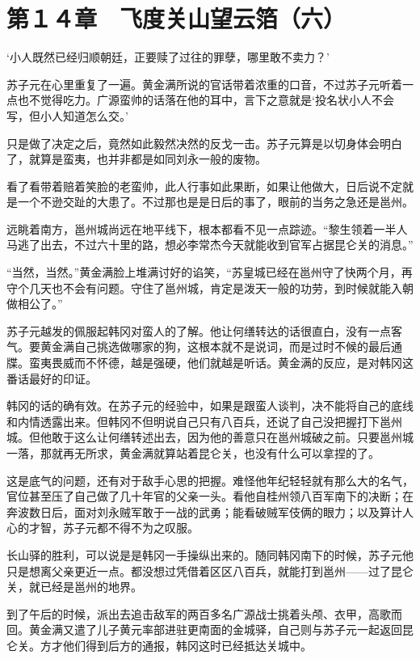 \section{第１４章　飞度关山望云箔（六）}

‘小人既然已经归顺朝廷，正要赎了过往的罪孽，哪里敢不卖力？’

苏子元在心里重复了一遍。黄金满所说的官话带着浓重的口音，不过苏子元听着一点也不觉得吃力。广源蛮帅的话落在他的耳中，言下之意就是‘投名状小人不会写，但小人知道怎么交。’

只是做了决定之后，竟然如此毅然决然的反戈一击。苏子元算是以切身体会明白了，就算是蛮夷，也并非都是如同刘永一般的废物。

看了看带着赔着笑脸的老蛮帅，此人行事如此果断，如果让他做大，日后说不定就是一个不逊交趾的大患了。不过那也是是日后的事了，眼前的当务之急还是邕州。

远眺着南方，邕州城尚远在地平线下，根本都看不见一点踪迹。“黎生领着一半人马逃了出去，不过六十里的路，想必李常杰今天就能收到官军占据昆仑关的消息。”

“当然，当然。”黄金满脸上堆满讨好的谄笑，“苏皇城已经在邕州守了快两个月，再守个几天也不会有问题。守住了邕州城，肯定是泼天一般的功劳，到时候就能入朝做相公了。”

苏子元越发的佩服起韩冈对蛮人的了解。他让何缮转达的话很直白，没有一点客气。要黄金满自己挑选做哪家的狗，这根本就不是说词，而是过时不候的最后通牒。蛮夷畏威而不怀德，越是强硬，他们就越是听话。黄金满的反应，是对韩冈这番话最好的印证。

韩冈的话的确有效。在苏子元的经验中，如果是跟蛮人谈判，决不能将自己的底线和内情透露出来。但韩冈不但明说自己只有八百兵，还说了自己没把握打下邕州城。但他敢于这么让何缮转述出去，因为他的善意只在邕州城破之前。只要邕州城一落，那就再无所求，黄金满就算站着昆仑关，也没有什么可以拿捏的了。

这是底气的问题，还有对于敌手心思的把握。难怪他年纪轻轻就有那么大的名气，官位甚至压了自己做了几十年官的父亲一头。看他自桂州领八百军南下的决断；在奔波数日后，面对刘永贼军敢于一战的武勇；能看破贼军伎俩的眼力；以及算计人心的才智，苏子元都不得不为之叹服。

长山驿的胜利，可以说是是韩冈一手操纵出来的。随同韩冈南下的时候，苏子元他只是想离父亲更近一点。都没想过凭借着区区八百兵，就能打到邕州——过了昆仑关，就已经是邕州的地界。

到了午后的时候，派出去追击敌军的两百多名广源战士挑着头颅、衣甲，高歌而回。黄金满又遣了儿子黄元率部进驻更南面的金城驿，自己则与苏子元一起返回昆仑关。方才他们得到后方的通报，韩冈这时已经抵达关城中。

